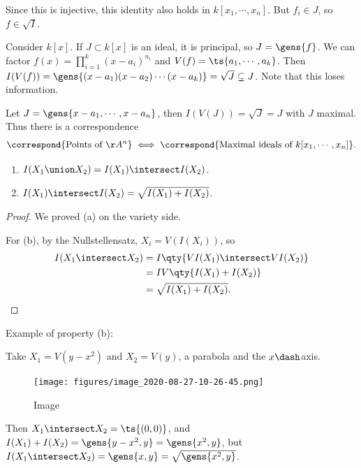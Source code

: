 Since this is injective, this identity also holds in
\(k[x_1, \cdots, x_n]\). But \(f_i\in J\), so \(f\in \sqrt{I}\).

\begin{example}

Consider \(k[x]\). If \(J\subset k[x]\) is an ideal, it is principal, so
\(J = \gens{f}\). We can factor \(f(x) = \prod_{i=1}^k (x-a_i)^{n_i}\)
and \(V(f) = \ts{a_1, \cdots, a_k}\). Then
\(I(V(f)) = \gens{(x-a_1)(x-a_2)\cdots(x-a_k)} = \sqrt{J} \subsetneq J\).
Note that this loses information.

\end{example}

\begin{example}

Let \(J = \gens{x-a_1, \cdots, x-a_n}\), then \(I(V(J)) = \sqrt{J} = J\)
with \(J\) maximal. Thus there is a correspondence
\begin{align*}  
\correspond{\text{Points of } \AA^n} \iff 
\correspond{\text{Maximal ideals of }k[x_1, \cdots, x_n]}
.\end{align*}

\end{example}

\begin{theorem}[Properties of $I$]

\hfill

\begin{enumerate}
\def\labelenumi{\alph{enumi}.}
\item
  \(I(X_1 \union X_2) = I(X_1) \intersect I(X_2)\).
\item
  \(I(X_1) \intersect I(X_2) = \sqrt{I(X_1) + I(X_2)}\).
\end{enumerate}

\end{theorem}

\begin{proof}

We proved (a) on the variety side.

For (b), by the Nullstellensatz, \(X_i = V(I(X_i))\), so
\begin{align*}  
I(X_1\intersect X_2) 
&=
I\qty{ VI(X_1) \intersect VI(X_2)} \\
&=
IV\qty{I(X_1) + I(X_2)} \\
&= \sqrt{I(X_1) + I(X_2)}
.\end{align*}

\end{proof}

\begin{example}

Example of property (b):

Take \(X_1 = V(y-x^2)\) and \(X_2 = V(y)\), a parabola and the
\(x\dash\)axis.

\begin{figure}
\centering
\texttt{[image: figures/image\_2020-08-27-10-26-45.png]}
\caption{Image}
\end{figure}

Then \(X_1 \intersect X_2 = \ts{(0, 0)}\), and
\(I(X_1) + I(X_2) = \gens{y-x^2, y} = \gens{x^2, y}\), but
\(I(X_1 \intersect X_2) = \gens{x, y} = \sqrt{\gens{x^2, y}}\).

\end{example}

